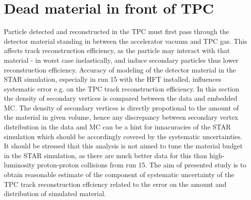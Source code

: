 

\newcommand{\itemm}{\item\hspace*{-5pt}.\hspace*{-1pt}~}

\chapter{Dead material in front of TPC}\label{chap:deadMaterial}

Particle detected and reconstructed in the TPC must first pass through the detector material standing in between the accelerator vacuum and TPC gas. This affects track reconstruction efficiency, as the particle may interact with that material - in worst case inelastically, and induce secondary particles thus lower reconstruction efficiency. Accuracy of modeling of the detector material in the STAR simulation, especially in run 15 with the HFT installed, influences systematic error e.g. on the TPC track reconstruction efficiency. In this section the density of secondary vertices is compared between the data and embedded MC. The density of secondary vertices is directly propotional to the amount of the material in given volume, hence any discrepancy between secondary vertex distribution in the data and MC can be a hint for innacuracies of the STAR simulation which should be accordingly covered by the systematic uncertainties. It should be stressed that this analysis is not aimed to tune the material budget in the STAR simulation, as there are much better data for this than high-luminosity proton-proton collisions from run 15. The aim of presented study is to obtain reasonable estimate of the component of systematic uncertainty of the TPC track reconstruction effciency related to the error on the amount and distribution of simulated material.

